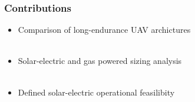 \documentclass{beamer}
\begin{document}
\begin{frame}
    \frametitle{Contributions}

    \begin{itemize}
        \item Comparison of long-endurance UAV archictures \\~\\
        \item Solar-electric and gas powered sizing analysis \\~\\
        \item Defined solar-electric operational feasilibity \\~\\
        \end{itemize}

\end{frame}
\end{document}
